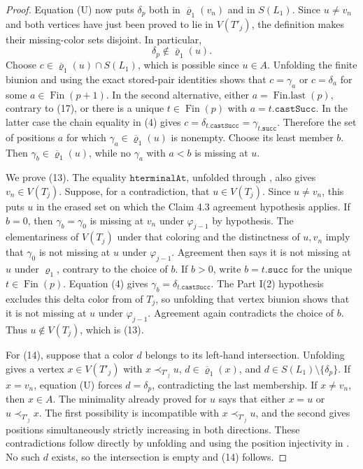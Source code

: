 \begin{proof}
Equation (U) now puts \(\delta_p\) both in
\(\overline\varrho_1(v_n)\) and in \(S(L_1)\).  Since \(u\ne v_n\) and
both vertices have just been proved to lie in \(V(T'_j)\), the definition
 makes their missing-color sets
disjoint.  In particular,
\[
                       \delta_p\notin\overline\varrho_1(u).  \tag{17}
\]
Choose \(c\in\overline\varrho_1(u)\cap S(L_1)\), which is possible since
\(u\in A\).  Unfolding the finite biunion and using the exact stored-pair
identities shows that \(c=\gamma_a\) or \(c=\delta_a\) for some
\(a\in\operatorname{Fin}(p+1)\).  In the second alternative, either
\(a=\operatorname{Fin.last}(p)\), contrary to (17), or there is a unique
\(t\in\operatorname{Fin}(p)\) with \(a=t.\mathtt{castSucc}\).  In the
latter case the chain equality in (4) gives
\(c=\delta_{t.\mathtt{castSucc}}=\gamma_{t.\mathtt{succ}}\).
Therefore the set of positions \(a\) for which
\(\gamma_a\in\overline\varrho_1(u)\) is nonempty.  Choose its least
member \(b\).  Then \(\gamma_b\in\overline\varrho_1(u)\), while no
\(\gamma_a\) with \(a<b\) is missing at \(u\).

We prove (13).  The equality \(\mathtt{hterminalAt}\), unfolded through
, also gives \(v_n\in V(T_j)\).  Suppose,
for a contradiction, that \(u\in V(T_j)\).  Since \(u\ne v_n\), this puts
\(u\) in the erased set on which the Claim 4.3 agreement hypothesis
applies.  If \(b=0\), then \(\gamma_b=\gamma_0\) is missing at \(v_n\)
under \(\varphi_{j-1}\) by hypothesis.  The elementariness of \(V(T_j)\)
under that coloring and the distinctness of \(u,v_n\) imply that
\(\gamma_0\) is not missing at \(u\) under \(\varphi_{j-1}\).  Agreement
then says it is not missing at \(u\) under \(\varrho_1\), contrary to the
choice of \(b\).  If \(b>0\), write \(b=t.\mathtt{succ}\) for the unique
\(t\in\operatorname{Fin}(p)\).  Equation (4) gives
\(\gamma_b=\delta_{t.\mathtt{castSucc}}\).  The Part I(2) hypothesis
excludes this delta color from  of \(T_j\), so
unfolding that vertex biunion shows that it is not missing at \(u\) under
\(\varphi_{j-1}\).  Agreement again contradicts the choice of \(b\).
Thus \(u\notin V(T_j)\), which is (13).

For (14), suppose that a color \(d\) belongs to its left-hand
intersection.  Unfolding  gives a vertex
\(x\in V(T'_j)\) with \(x\prec_{T'_j}u\),
\(d\in\overline\varrho_1(x)\), and
\(d\in S(L_1)\setminus\{\delta_p\}\).  If \(x=v_n\), equation (U) forces
\(d=\delta_p\), contradicting the last membership.  If \(x\ne v_n\),
then \(x\in A\).  The minimality already proved for \(u\) says that either
\(x=u\) or \(u\prec_{T'_j}x\).  The first possibility is incompatible
with \(x\prec_{T'_j}u\), and the second gives positions simultaneously
strictly increasing in both directions.  These contradictions follow
directly by unfolding  and using the position
injectivity in .  No such \(d\) exists, so the
intersection is empty and (14) follows.


\end{proof}
